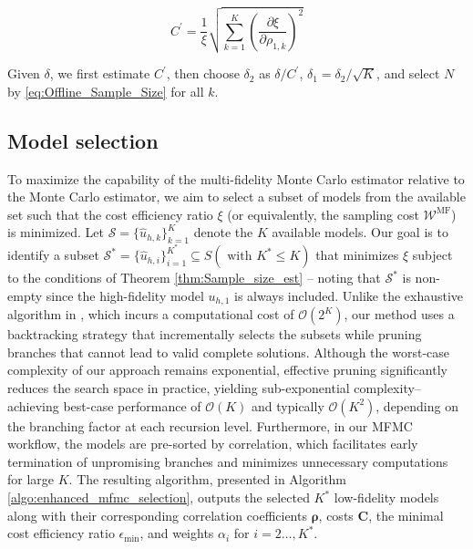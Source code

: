 \begin{equation}
    C^\prime  = \frac{1}{\xi}\sqrt{\sum_{k=1}^K \left(\frac{\partial \xi}{\partial \rho_{1,k}}\right)^2}
\end{equation}


Given $\delta$, we first estimate $C^\prime$, then choose $\delta_2$ as $\delta/C^\prime$, $\delta_1=\delta_2/\sqrt{K}$, and select $N$ by \eqref{eq:Offline_Sample_Size} for all $k$.




\subsection{Model selection}
To maximize the capability of the multi-fidelity Monte Carlo estimator relative to the Monte Carlo estimator, we aim to select a subset of models from the available set such that the cost efficiency ratio $\xi$ (or equivalently, the sampling cost $\mathcal{W}^\text{MF}$) is minimized. Let $\mathcal{S}=\{\widehat u_{h, k}\}_{k=1}^K$ denote the $K$ available models. Our goal is to identify a subset  $\mathcal{S}^*=\{ \widehat u_{h, i}\}_{i=1}^{K^*} \subseteq S ( \text{ with } K^*\le K)$ that minimizes $\xi$  subject to the conditions of Theorem \ref{thm:Sample_size_est} -- noting that $\mathcal{S}^*$ is non-empty since the high-fidelity model $u_{h,1}$ is always included. Unlike the exhaustive algorithm in \cite[Algorithm~1]{PeWiGu:2016}, which incurs a computational cost of $\mathcal{O}(2^K)$, our method uses a backtracking strategy that incrementally selects the subsets while pruning branches that cannot lead to valid complete solutions. Although the worst-case complexity of our approach remains exponential, effective pruning significantly reduces the search space in practice, yielding sub-exponential complexity--achieving best-case performance of $\mathcal{O}(K)$ and typically $\mathcal{O}(K^2)$, depending on the branching factor at each recursion level. Furthermore, in our MFMC workflow, the models are pre-sorted by correlation, which facilitates early termination of unpromising branches and minimizes unnecessary computations for large $K$. The resulting algorithm, presented in Algorithm \ref{algo:enhanced_mfmc_selection}, outputs the selected $K^*$ low-fidelity models along with their corresponding correlation coefficients $\boldsymbol{\rho}$, costs $\boldsymbol{C}$, the minimal cost efficiency ratio $\epsilon_{\text{min}}$, and weights $\alpha_i$ for $i=2\ldots, K^*$. 

